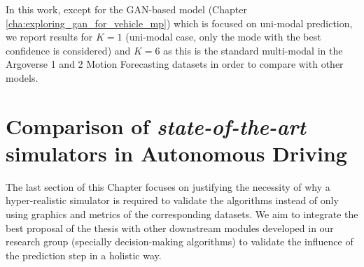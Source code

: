 In this work, except for the GAN-based model (Chapter \ref{cha:exploring_gan_for_vehicle_mp}) which is focused on uni-modal prediction, we report results for $K=1$ (uni-modal case, only the mode with the best confidence is considered) and $K=6$ as this is the standard multi-modal in the Argoverse 1 and 2 Motion Forecasting datasets in order to compare with other models.

\section{Comparison of \textit{state-of-the-art} simulators in Autonomous Driving}
\label{sec:2_sota_simulators_ad}

The last section of this Chapter focuses on justifying the necessity of why a hyper-realistic simulator is required to validate the algorithms instead of only using graphics and metrics of the corresponding datasets. We aim to integrate the best proposal of the thesis with other downstream modules developed in our research group (specially decision-making algorithms) to validate the influence of the prediction step in a holistic way.



